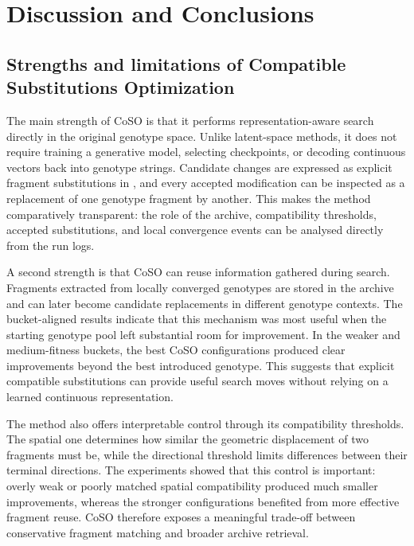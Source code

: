 \chapter{Discussion and Conclusions}



\section{Strengths and limitations of Compatible Substitutions Optimization}

The main strength of CoSO is that it performs representation-aware search directly in the original genotype space. Unlike latent-space methods, it does not require training a generative model, selecting checkpoints, or decoding continuous vectors back into genotype strings. Candidate changes are expressed as explicit fragment substitutions in \fone{}, and every accepted modification can be inspected as a replacement of one genotype fragment by another. This makes the method comparatively transparent: the role of the archive, compatibility thresholds, accepted substitutions, and local convergence events can be analysed directly from the run logs.

A second strength is that CoSO can reuse information gathered during search. Fragments extracted from locally converged genotypes are stored in the archive and can later become candidate replacements in different genotype contexts. The bucket-aligned results indicate that this mechanism was most useful when the starting genotype pool left substantial room for improvement. In the weaker and medium-fitness buckets, the best CoSO configurations produced clear improvements beyond the best introduced genotype. This suggests that explicit compatible substitutions can provide useful search moves without relying on a learned continuous representation.

The method also offers interpretable control through its compatibility thresholds. The spatial one determines how similar the geometric displacement of two fragments must be, while the directional threshold limits differences between their terminal directions. The experiments showed that this control is important: overly weak or poorly matched spatial compatibility produced much smaller improvements, whereas the stronger configurations benefited from more effective fragment reuse. CoSO therefore exposes a meaningful trade-off between conservative fragment matching and broader archive retrieval.

